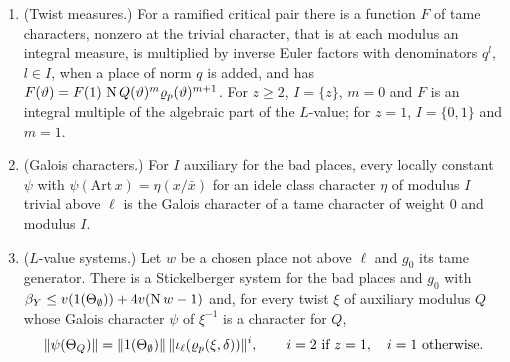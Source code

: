 \begin{proposition}\label{prop:L-value-systems}
\begin{enumerate}[label=\textup{(\alph*)}]
\item (Twist measures.) For a ramified critical pair there is a function $F$ of tame characters, nonzero at the trivial character, that is at each modulus an integral measure, is multiplied by inverse Euler factors with
denominators $q^l$, $l\in I$, when a place of norm $q$ is added, and has $F(\vartheta)=F(1)\,\operatorname{N} Q(\vartheta)^m\varrho_p(\vartheta)^{m+1}$. For $z\ge2$, $I=\{z\}$, $m=0$ and $F$ is an integral multiple of the algebraic part of the $L$-value; for $z=1$,
$I=\{0,1\}$ and $m=1$.
\item (Galois characters.) For $I$ auxiliary for the bad places, every locally constant $\psi$ with $\psi(\mathrm{Art}\,x)=\eta(x/\bar x)$ for an idele class character $\eta$ of modulus $I$ trivial above $\ell$ is the Galois character of a tame
character of weight $0$ and modulus $I$.
\item ($L$-value systems.) Let $w$ be a chosen place not above $\ell$ and $g_0$ its tame generator. There is a Stickelberger system for the bad places and $g_0$ with $\beta_Y\le v(1(\Theta_\emptyset))+4v(\operatorname{N} w-1)$ and, for every twist
$\xi$ of auxiliary modulus $Q$ whose Galois character $\psi$ of $\xi^{-1}$ is a character for $Q$,
\[
  \lVert \psi(\Theta_Q)\rVert=\lVert 1(\Theta_\emptyset)\rVert\,\lVert \iota_\ell(\varrho_p(\xi,\delta))\rVert^{i},\qquad i=2\text{ if }z=1,\quad i=1\text{ otherwise}.
\]
\end{enumerate}
\end{proposition}

